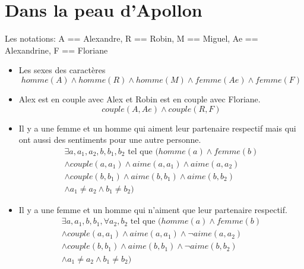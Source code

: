 \documentclass{article}
\begin{document}
\section{Dans la peau d'Apollon}
    Les notations: A == Alexandre, R == Robin, M == Miguel, Ae == Alexandrine, F == Floriane
    \begin{itemize}
        \item Les sexes des caractères
            \begin{equation}
            homme(A) \land homme(R) \land homme (M) \land femme(Ae) \land femme(F)
            \end{equation}
        \item Alex est en couple avec Alex et Robin est en couple avec Floriane.
            \begin{equation}
            couple(A, Ae) \land couple(R, F)
            \end{equation}
        \item Il y a une femme et un homme qui aiment leur partenaire respectif mais qui ont aussi des sentiments pour une autre personne.
            \begin{equation}
            \begin{split}
            \exists a, a_1, a_2, b, b_1, b_2 \text{ tel que }(homme(a) \land femme(b) \\
            \land couple(a, a_1) \land aime(a, a_1) \land aime(a, a_2) \\
            \land couple(b, b_1) \land aime(b, b_1) \land aime(b, b_2) \\
            \land a_1 \neq a_2 \land b_1 \neq b_2)
            \end{split}
            \end{equation}
        \item Il y a une femme et un homme qui n’aiment que leur partenaire respectif.
            \begin{equation}
            \begin{split}
            \exists a, a_1, b, b_1,\forall a_2, b_2 \text{ tel que }(homme(a) \land femme(b) \\
            \land couple(a, a_1) \land aime(a, a_1) \land \neg aime(a, a_2) \\
            \land couple(b, b_1) \land aime(b, b_1) \land \neg aime(b, b_2) \\
            \land a_1 \neq a_2 \land b_1 \neq b_2)
            \end{split}
            \end{equation}

\end{itemize}
\end{document}
